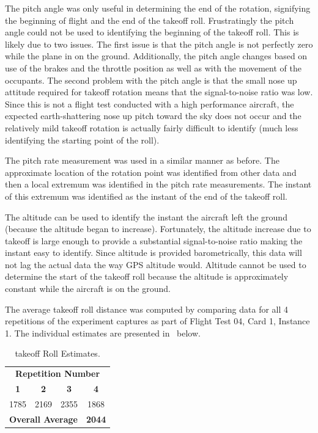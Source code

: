 \documentclass[conf]{new-aiaa}
\begin{document}
The pitch angle was only useful in determining the end of the rotation, signifying the beginning of flight and the end of the takeoff roll. Frustratingly the pitch angle could not be used to identifying the beginning of the takeoff roll. This is likely due to two issues. The first issue is that the pitch angle is not perfectly zero while the plane in on the ground. Additionally, the pitch angle changes based on use of the brakes and the throttle position as well as with the movement of the occupants. The second problem with the pitch angle is that the small nose up attitude required for takeoff rotation means that the signal-to-noise ratio was low. Since this is not a flight test conducted with a high performance aircraft, the expected earth-shattering nose up pitch toward the sky does not occur and the relatively mild takeoff rotation is actually fairly difficult to identify (much less identifying the starting point of the roll).

The pitch rate measurement was used in a similar manner as before. The approximate location of the rotation point was identified from other data and then a local extremum was identified in the pitch rate measurements. The instant of this extremum was identified as the instant of the end of the takeoff roll.

The altitude can be used to identify the instant the aircraft left the ground (because the altitude began to increase). Fortunately, the altitude increase due to takeoff is large enough to provide a substantial signal-to-noise ratio making the instant easy to identify. Since altitude is provided barometrically, this data will not lag the actual data the way GPS altitude would. Altitude cannot be used to determine the start of the takeoff roll because the altitude is approximately constant while the aircraft is on the ground.

The average takeoff roll distance was computed by comparing data for all 4 repetitions of the experiment captures as part of Flight Test 04, Card 1, Instance 1. The individual estimates are presented in~ below.

\begin{table}[htp!]
\centering
\caption{takeoff Roll Estimates.}
\label{takeofftable}
\begin{tabular}{ c | c | c | c }
	\multicolumn{4}{c}{\textbf{Repetition Number}}										\\
	\textbf{1} & \textbf{2} & \textbf{3} & \textbf{4}									\\
	\hline
	\SI{1785}{\foot} & \SI{2169}{\foot} & \SI{2355}{\foot} & \SI{1868}{\foot}			\\
	\hline
	\hline
	\multicolumn{3}{c}{\textbf{Overall Average}} & \textbf{\SI[detect-weight=true]{2044}{\foot}}	\\
	\hline
\end{tabular}
\end{table}
\end{document}
